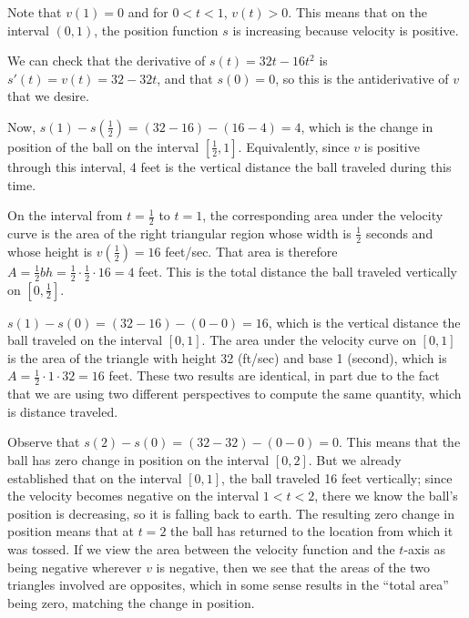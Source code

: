 \begin{activitySolution}
\ba
	\item Note that $v(1) = 0$ and for $0 < t < 1$, $v(t) > 0$.  This means that on the interval $(0,1)$, the position function $s$ is increasing because velocity is positive.
	\item We can check that the derivative of $s(t) = 32t - 16t^2$ is $s'(t) = v(t) = 32 - 32t$, and that $s(0) = 0$, so this is the antiderivative of $v$ that we desire.
	\item Now, $s(1) - s(\frac{1}{2}) = (32 - 16) - (16 - 4) = 4$, which is the change in position of the ball on the interval $[\frac{1}{2},1]$.  Equivalently, since $v$ is positive through this interval, 4 feet is the vertical distance the ball traveled during this time.
	\item On the interval from $t = \frac{1}{2}$ to $t = 1$, the corresponding area under the velocity curve is the area of the right triangular region whose width is $\frac{1}{2}$ seconds and whose height is $v(\frac{1}{2}) = 16$ feet/sec.  That area is therefore $A = \frac{1}{2} bh = \frac{1}{2} \cdot \frac{1}{2} \cdot 16 = 4$ feet.  This is the total distance the ball traveled vertically on $[0,\frac{1}{2}]$.
	\item $s(1) - s(0) = (32 - 16) - (0-0) = 16$, which is the vertical distance the ball traveled on the interval $[0,1]$.  The area under the velocity curve on $[0,1]$ is the area of the triangle with height 32 (ft/sec) and base 1 (second), which is $A = \frac{1}{2} \cdot 1 \cdot 32 = 16$ feet.  These two results are identical, in part due to the fact that we are using two different perspectives to compute the same quantity, which is distance traveled.
	\item Observe that $s(2) - s(0) = (32 - 32) - (0 - 0) = 0$.  This means that the ball has zero change in position on the interval $[0,2]$.  But we already established that on the interval $[0,1]$, the ball traveled 16 feet vertically; since the velocity becomes negative on the interval $1 < t < 2$, there we know the ball's position is decreasing, so it is falling back to earth.  The resulting zero change in position means that at $t = 2$ the ball has returned to the location from which it was tossed.  If we view the area between the velocity function and the $t$-axis as being negative wherever $v$ is negative, then we see that the areas of the two triangles involved are opposites, which in some sense results in the ``total area'' being zero, matching the change in position.
\ea
\end{activitySolution}
\aftera

